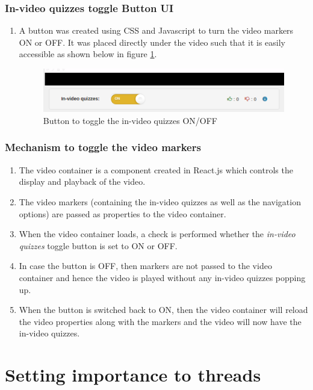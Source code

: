 \subsubsection{In-video quizzes toggle Button UI}
\begin{enumerate}
	\item A button was created using CSS and Javascript to turn the video markers ON or OFF. It was placed directly under the video such that it is easily accessible as shown below in figure \ref{fig:video-popup}.

	\begin{figure}[h]
	\centering
	\includegraphics[width=0.95\linewidth]{./media/video_popup}
	\caption{Button to toggle the in-video quizzes ON/OFF}
	\label{fig:video-popup}
	\end{figure}

\end{enumerate}

\subsubsection{Mechanism to toggle the video markers}
\begin{enumerate}
	\item The video container is a component created in React.js  which controls the display and playback of the video.
	\item The video markers (containing the in-video quizzes as well as the navigation options) are passed as properties to the video container.
	\item When the video container loads, a check is performed whether the \textit{in-video quizzes} toggle button is set to ON or OFF.
	\item In case the button is OFF, then markers are not passed to the video container and hence the video is played without any in-video quizzes popping up.
	\item When the button is switched back to ON, then the video container will reload the video properties along with the markers and the video will now have the in-video quizzes.
\end{enumerate}

\newpage

\section{Setting importance to threads}

